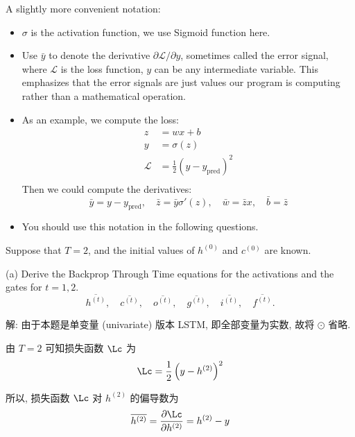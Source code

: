 \documentclass[openany]{ctexbook}
\theoremstyle{kaiti}
\theoremstyle{normal}
\begin{document}
A slightly more convenient notation:
\begin{itemize}
  \item $\sigma$ is the activation function, we use Sigmoid function here. 
  \item Use $\bar{y}$ to denote the derivative $\partial\mathcal{L}/\partial y$, sometimes called the error signal, where $\mathcal{L}$ is the loss function, $y$ can be any intermediate variable. This emphasizes that the error signals are just values our program is computing rather than a mathematical operation.
  \item As an example, we compute the loss:
  \begin{equation}
    \begin{aligned}
      z &= wx + b\\
      y &= \sigma(z)\\
      \mathcal{L} &= \frac{1}{2}(y-y_\mathrm{pred})^2 \\
    \end{aligned}
  \end{equation}
  Then we could compute the derivatives:
  \begin{equation}
    \bar{y} = y - y_\mathrm{pred},\quad
    \bar{z} = \bar{y}\sigma'(z),\quad
    \bar{w} = \bar{z}x,\quad
    \bar{b} = \bar{z}
  \end{equation}
  \item You should use this notation in the following questions.
\end{itemize}

Suppose that $T = 2$, and the initial values of $h^{(0)}$ and $c^{(0)}$ are known.

(a) Derive the Backprop Through Time equations for the activations and the gates for $t=1, 2$.
\begin{equation}
  \overline{h^{(t)}},\quad
  \overline{c^{(t)}},\quad
  \overline{o^{(t)}},\quad
  \overline{g^{(t)}},\quad
  \overline{i^{(t)}},\quad
  \overline{f^{(t)}}.
\end{equation}

解: 由于本题是单变量 (univariate) 版本 LSTM, 即全部变量为实数, 故将 $\odot$ 省略. 

由 $T=2$ 可知损失函数 $\Lc$ 为
\begin{equation}
  \Lc=\frac{1}{2}\left(y-h^{(2)}\right)^2
\end{equation}

所以, 损失函数 $\Lc$ 对 $h^{(2)}$ 的偏导数为
\begin{equation}
  \overline{h^{(2)}}
  =\frac{\partial\Lc}{\partial h^{(2)}}
  =h^{(2)}-y
\end{equation}
\end{document}
